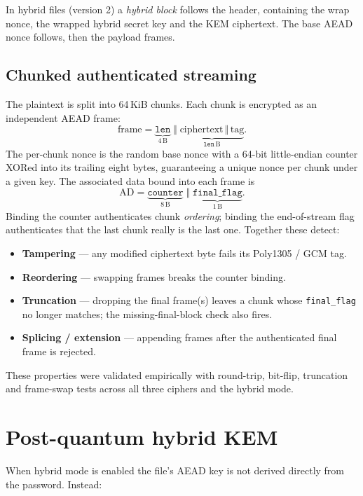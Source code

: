 \documentclass[11pt,a4paper]{article}
\newcommand{\code}[1]{\texttt{#1}}
\begin{document}
In hybrid files (version 2) a \emph{hybrid block} follows the header,
containing the wrap nonce, the wrapped hybrid secret key and the KEM
ciphertext. The base AEAD nonce follows, then the payload frames.

\subsection{Chunked authenticated streaming}

The plaintext is split into 64\,KiB chunks. Each chunk is encrypted as an
independent AEAD frame:
\[
  \text{frame} = \underbrace{\texttt{len}}_{4\,\text{B}} \;\Vert\;
  \underbrace{\text{ciphertext} \,\Vert\, \text{tag}}_{\texttt{len}\,\text{B}}.
\]
The per-chunk nonce is the random base nonce with a 64-bit little-endian
counter XORed into its trailing eight bytes, guaranteeing a unique nonce per
chunk under a given key. The associated data bound into each frame is
\[
  \text{AD} = \underbrace{\texttt{counter}}_{8\,\text{B}} \;\Vert\;
  \underbrace{\texttt{final\_flag}}_{1\,\text{B}}.
\]
Binding the counter authenticates chunk \emph{ordering}; binding the
end-of-stream flag authenticates that the last chunk really is the last one.
Together these detect:
\begin{itemize}[leftmargin=1.4em]
  \item \textbf{Tampering} — any modified ciphertext byte fails its Poly1305
        / GCM tag.
  \item \textbf{Reordering} — swapping frames breaks the counter binding.
  \item \textbf{Truncation} — dropping the final frame(s) leaves a chunk whose
        \code{final\_flag} no longer matches; the missing-final-block check
        also fires.
  \item \textbf{Splicing / extension} — appending frames after the
        authenticated final frame is rejected.
\end{itemize}
These properties were validated empirically with round-trip, bit-flip,
truncation and frame-swap tests across all three ciphers and the hybrid mode.

\section{Post-quantum hybrid KEM}

When hybrid mode is enabled the file's AEAD key is not derived directly from
the password. Instead:
\end{document}

